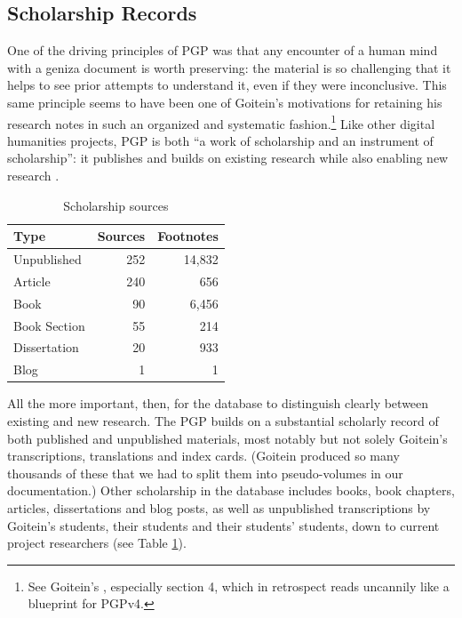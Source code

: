 \documentclass{article}
\begin{document}
\subsection{Scholarship Records}

One of the driving principles of PGP was that any encounter of a human mind with a geniza document is worth preserving: the material is so challenging that it helps to see prior attempts to understand it, even if they were inconclusive. This same principle seems to have been one of Goitein's motivations for retaining his research notes in such an organized and systematic fashion.\footnote{See Goitein's , especially section 4, which in retrospect reads uncannily like a blueprint for PGPv4.} Like other digital humanities projects, PGP is both “a work of scholarship and an instrument of scholarship”: it publishes and builds on existing research while also enabling new research \autocite[2]{kotin_world_2024}.

\begin{table}
\caption{Scholarship sources}
\label{table:scholarship_sources}
\begin{tabular}{lrr}
\toprule
Type & Sources & Footnotes \\
\midrule
Unpublished & 252 & 14,832 \\
Article & 240 & 656 \\
Book & 90 & 6,456 \\
Book Section & 55 & 214 \\
Dissertation & 20 & 933 \\
Blog & 1 & 1 \\
\bottomrule
\end{tabular}
\end{table}
All the more important, then, for the database to distinguish clearly between existing and new research. The PGP builds on a substantial scholarly record of both published and unpublished materials, most notably but not solely Goitein’s transcriptions, translations and index cards. (Goitein produced so many thousands of these that we had to split them into pseudo-volumes in our documentation.) Other scholarship in the database includes books, book chapters, articles, dissertations and blog posts, as well as unpublished transcriptions by Goitein’s students, their students and their students’ students, down to current project researchers (see Table \ref{table:scholarship_sources}). 
\end{document}
